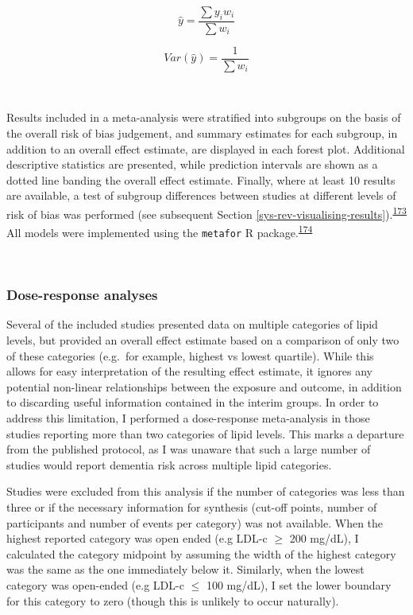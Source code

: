 \documentclass[a4paper, twoside]{templates/ociamthesis}
\begin{document}
\begin{equation}
\hat{y} = \frac{\sum{y_iw_i}}{\sum{w_i}}
  \label{eq:rmaEstimate}
\end{equation}

\begin{equation}
Var(\hat{y}) = \frac{1}{\sum{w_i}}
  \label{eq:rmaVariance}
\end{equation}

~

Results included in a meta-analysis were stratified into subgroups on the basis of the overall risk of bias judgement, and summary estimates for each subgroup, in addition to an overall effect estimate, are displayed in each forest plot. Additional descriptive statistics are presented, while prediction intervals are shown as a dotted line banding the overall effect estimate. Finally, where at least 10 results are available, a test of subgroup differences between studies at different levels of risk of bias was performed (see subsequent Section \ref{sys-rev-visualising-results}).\textsuperscript{\protect\hyperlink{ref-deeks2019}{173}} All models were implemented using the \texttt{metafor} R package.\textsuperscript{\protect\hyperlink{ref-R-metafor}{174}}

~

\hypertarget{dose-response-analyses}{%
\subsubsection{Dose-response analyses}\label{dose-response-analyses}}

Several of the included studies presented data on multiple categories of lipid levels, but provided an overall effect estimate based on a comparison of only two of these categories (e.g.~for example, highest vs lowest quartile). While this allows for easy interpretation of the resulting effect estimate, it ignores any potential non-linear relationships between the exposure and outcome, in addition to discarding useful information contained in the interim groups. In order to address this limitation, I performed a dose-response meta-analysis in those studies reporting more than two categories of lipid levels. This marks a departure from the published protocol, as I was unaware that such a large number of studies would report dementia risk across multiple lipid categories.

Studies were excluded from this analysis if the number of categories was less than three or if the necessary information for synthesis (cut-off points, number of participants and number of events per category) was not available. When the highest reported category was open ended (e.g LDL-c \(\geqslant\) 200 mg/dL), I calculated the category midpoint by assuming the width of the highest category was the same as the one immediately below it. Similarly, when the lowest category was open-ended (e.g LDL-c \(\leqslant\) 100 mg/dL), I set the lower boundary for this category to zero (though this is unlikely to occur naturally).
\end{document}
